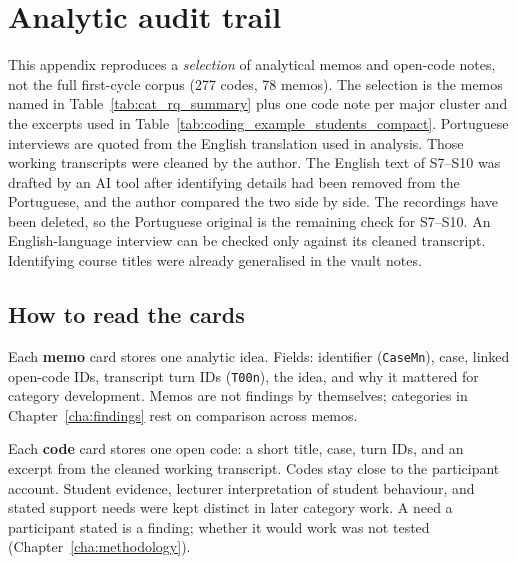 
%

\chapter{Analytic audit trail}
\label{app:audit_trail}

This appendix reproduces a \emph{selection} of analytical memos and open-code notes, not the full first-cycle corpus (277 codes, 78 memos). The selection is the memos named in Table~\ref{tab:cat_rq_summary} plus one code note per major cluster and the excerpts used in Table~\ref{tab:coding_example_students_compact}. Portuguese interviews are quoted from the English translation used in analysis. Those working transcripts were cleaned by the author. The English text of S7--S10 was drafted by an AI tool after identifying details had been removed from the Portuguese, and the author compared the two side by side. The recordings have been deleted, so the Portuguese original is the remaining check for S7--S10. An English-language interview can be checked only against its cleaned transcript. Identifying course titles were already generalised in the vault notes.

\section{How to read the cards}
\label{app:audit_legend}

Each \textbf{memo} card stores one analytic idea. Fields: identifier (\texttt{CaseMn}), case, linked open-code IDs, transcript turn IDs (\texttt{T00n}), the idea, and why it mattered for category development. Memos are not findings by themselves; categories in Chapter~\ref{cha:findings} rest on comparison across memos.

Each \textbf{code} card stores one open code: a short title, case, turn IDs, and an excerpt from the cleaned working transcript. Codes stay close to the participant account. Student evidence, lecturer interpretation of student behaviour, and stated support needs were kept distinct in later category work. A need a participant stated is a finding; whether it would work was not tested (Chapter~\ref{cha:methodology}).

